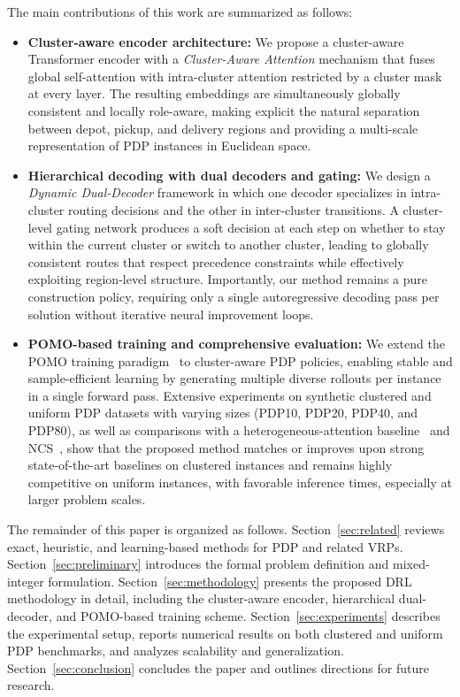 \documentclass[pdflatex,sn-basic,Numbered]{sn-jnl}
\begin{document}
The main contributions of this work are summarized as follows:
\begin{itemize}
  \item \textbf{Cluster-aware encoder architecture:} We propose a cluster-aware Transformer encoder with a \emph{Cluster-Aware Attention} mechanism that fuses global self-attention with intra-cluster attention restricted by a cluster mask at every layer. The resulting embeddings are simultaneously globally consistent and locally role-aware, making explicit the natural separation between depot, pickup, and delivery regions and providing a multi-scale representation of PDP instances in Euclidean space.
  \item \textbf{Hierarchical decoding with dual decoders and gating:} We design a \emph{Dynamic Dual-Decoder} framework in which one decoder specializes in intra-cluster routing decisions and the other in inter-cluster transitions. A cluster-level gating network produces a soft decision at each step on whether to stay within the current cluster or switch to another cluster, leading to globally consistent routes that respect precedence constraints while effectively exploiting region-level structure. Importantly, our method remains a pure construction policy, requiring only a single autoregressive decoding pass per solution without iterative neural improvement loops.
  \item \textbf{POMO-based training and comprehensive evaluation:} We extend the POMO training paradigm~\cite{kwon2020pomo} to cluster-aware PDP policies, enabling stable and sample-efficient learning by generating multiple diverse rollouts per instance in a single forward pass. Extensive experiments on synthetic clustered and uniform PDP datasets with varying sizes (PDP10, PDP20, PDP40, and PDP80), as well as comparisons with a heterogeneous-attention baseline~\cite{li2022heter} and NCS~\cite{kong2024ncs}, show that the proposed method matches or improves upon strong state-of-the-art baselines on clustered instances and remains highly competitive on uniform instances, with favorable inference times, especially at larger problem scales.
\end{itemize}

The remainder of this paper is organized as follows. Section~\ref{sec:related} reviews exact, heuristic, and learning-based methods for PDP and related VRPs. Section~\ref{sec:preliminary} introduces the formal problem definition and mixed-integer formulation. Section~\ref{sec:methodology} presents the proposed DRL methodology in detail, including the cluster-aware encoder, hierarchical dual-decoder, and POMO-based training scheme. Section~\ref{sec:experiments} describes the experimental setup, reports numerical results on both clustered and uniform PDP benchmarks, and analyzes scalability and generalization. Section~\ref{sec:conclusion} concludes the paper and outlines directions for future research.
\end{document}

